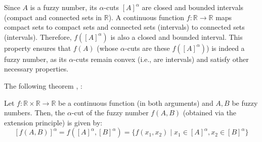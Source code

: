 \begin{remark}
Since $A$ is a fuzzy number, its $\alpha$-cuts $[A]^\alpha$ are closed and bounded intervals (compact and connected sets in $\mathbb{R}$). A continuous function $f: \mathbb{R} \to \mathbb{R}$ maps compact sets to compact sets and connected sets (intervals) to connected sets (intervals). Therefore, $f([A]^\alpha)$ is also a closed and bounded interval. This property ensures that $f(A)$ (whose $\alpha$-cuts are these $f([A]^\alpha)$) is indeed a fuzzy number, as its $\alpha$-cuts remain convex (i.e., are intervals) and satisfy other necessary properties. 
\end{remark}
The following theorem \cite[Thm. 1.3.2, p. 18]{FULLER2}, \cite{NGUYEN1978}:
\begin{theorem}
    Let $f: \mathbb{R} \times \mathbb{R} \to \mathbb{R}$ be a continuous function (in both arguments) and $A, B$ be fuzzy numbers. Then, the $\alpha$-cut of the fuzzy number $f(A,B)$ (obtained via the extension principle) is given by:
    \[
    [f(A,B)]^{\alpha} = f([A]^{\alpha}, [B]^{\alpha}) = \{f(x_1, x_2) \mid x_1 \in [A]^\alpha, x_2 \in [B]^\alpha\}
    \]
\end{theorem}

